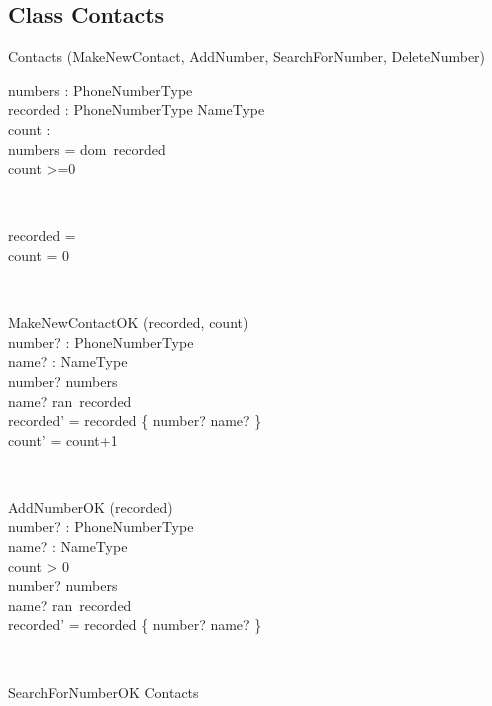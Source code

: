 \documentclass[12pt]{article}
\begin{document}
\begin{spacing}{1.5}
\subsection{Class Contacts}
\begin{class}{Contacts}
\also
\upharpoonright (MakeNewContact, AddNumber, SearchForNumber, DeleteNumber) \\
\begin{state}
numbers :  PhoneNumberType\\
recorded : PhoneNumberType \pfun NameType\\
count :   \\
\where
numbers = dom~recorded \\
count >=0 \\
\end{state} \\
\begin{init}
recorded = \emptyset \\ %
count = 0 \\
\end{init} \\
\begin{op}{MakeNewContactOK}
\Delta (recorded, count) \\
number? : PhoneNumberType\\
name? : NameType\\
\ST
number? \notin numbers\\
name? \notin ran~recorded\\
recorded' = recorded \cup \{ number? \mapsto name? \} \\
count' = count+1 \\
\end{op}\\
\begin{op}{AddNumberOK}
\Delta (recorded) \\
number? : PhoneNumberType\\
name? : NameType\\
\ST
count > 0 \\
number? \notin numbers\\
name? \in ran~recorded\\
recorded' = recorded \cup \{ number? \mapsto name? \} \\
\end{op}\\
\begin{op}{SearchForNumberOK}
\Xi Contacts\\

\end{op}
\end{class}
\end{spacing}
\end{document}
